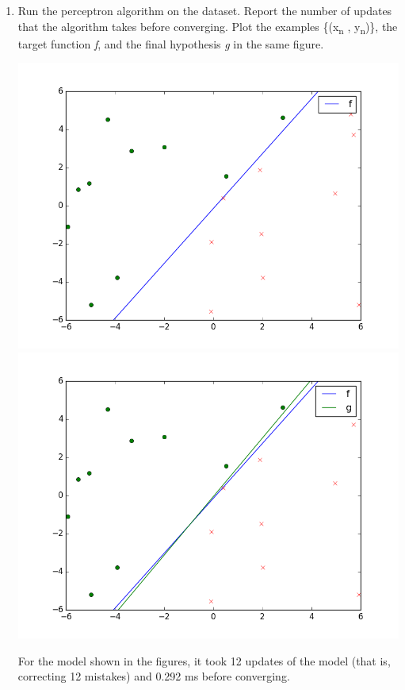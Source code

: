 \documentclass{article}
\begin{document}
\begin{enumerate}[label=(\alph*)]
\item Run the perceptron algorithm on the dataset. Report the number of updates that the algorithm takes before converging. Plot the examples \{(x\textsubscript{n} , y\textsubscript{n})\}, the target function \textit{f}, and the final hypothesis \textit{g} in the same figure.
\begin{center}
\includegraphics[scale=0.35]{images/2_a.png} 
\includegraphics[scale=0.35]{images/2_b.png} 
\end{center}
For the model shown in the figures, it took 12 updates of the model (that is, correcting 12 mistakes) and 0.292 ms before converging. 


\end{enumerate}
\end{document}
